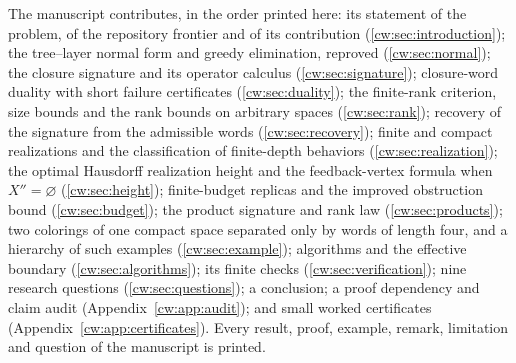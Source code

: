 \documentclass[11pt,letterpaper]{article}
\numberwithin{equation}{section}
\theoremstyle{definition}
\theoremstyle{remark}
\theoremstyle{definition}
\begin{document}
The manuscript contributes, in the order printed here: its statement of the
problem, of the repository frontier and of its contribution
(\cref{cw:sec:introduction}); the tree--layer normal form and greedy
elimination, reproved (\cref{cw:sec:normal}); the closure signature and its
operator calculus (\cref{cw:sec:signature}); closure-word duality with short
failure certificates (\cref{cw:sec:duality}); the finite-rank criterion, size
bounds and the rank bounds on arbitrary spaces (\cref{cw:sec:rank}); recovery
of the signature from the admissible words (\cref{cw:sec:recovery}); finite and
compact realizations and the classification of finite-depth behaviors
(\cref{cw:sec:realization}); the optimal Hausdorff realization height and the
feedback-vertex formula when $X''=\varnothing$ (\cref{cw:sec:height});
finite-budget replicas and the improved obstruction bound
(\cref{cw:sec:budget}); the product signature and rank law
(\cref{cw:sec:products}); two colorings of one compact space separated only by
words of length four, and a hierarchy of such examples
(\cref{cw:sec:example}); algorithms and the effective boundary
(\cref{cw:sec:algorithms}); its finite checks (\cref{cw:sec:verification});
nine research questions (\cref{cw:sec:questions}); a conclusion; a proof
dependency and claim audit (Appendix~\ref{cw:app:audit}); and small worked
certificates (Appendix~\ref{cw:app:certificates}). Every result, proof,
example, remark, limitation and question of the manuscript is printed.
\end{document}
